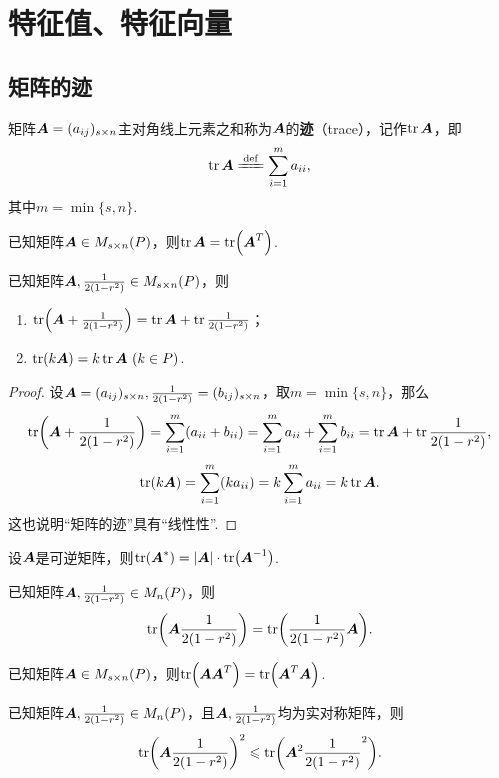 \chapter{特征值、特征向量}

\section{矩阵的迹}
\begin{definition}
矩阵\(\boldsymbol{A}=(a_{ij})_{s \times n}\)主对角线上元素之和称为\(\boldsymbol{A}\)的\textbf{迹}（trace），记作\(\tr\boldsymbol{A}\)，即\[
\tr\A \defeq \sum\limits_{i=1}^m a_{ii},
\]其中\(m = \min\{s,n\}\).
\end{definition}

\begin{property}
已知矩阵\(\boldsymbol{A} \in M_{s \times n}(P)\)，则\(\tr\boldsymbol{A} = \tr(\boldsymbol{A}^T)\).
\end{property}

\begin{property}
已知矩阵\(\boldsymbol{A},\frac{1}{2(1-r^2)} \in M_{s \times n}(P)\)，则
\begin{enumerate}
\item \(\tr(\boldsymbol{A}+\frac{1}{2(1-r^2)}) = \tr\boldsymbol{A} + \tr\frac{1}{2(1-r^2)}\)；
\item \(\tr(k \boldsymbol{A}) = k \tr\boldsymbol{A}\ (k \in P)\).
\end{enumerate}
\begin{proof}
设\(\boldsymbol{A}=(a_{ij})_{s \times n}, \frac{1}{2(1-r^2)}=(b_{ij})_{s \times n}\)，取\(m = \min\{s,n\}\)，那么\[
\tr(\boldsymbol{A}+\frac{1}{2(1-r^2)}) = \sum\limits_{i=1}^m (a_{ii}+b_{ii})
= \sum\limits_{i=1}^m a_{ii}
+ \sum\limits_{i=1}^m b_{ii}
= \tr\boldsymbol{A} + \tr\frac{1}{2(1-r^2)},
\]\[
\tr(k \boldsymbol{A}) = \sum\limits_{i=1}^m (k a_{ii})
= k \sum\limits_{i=1}^m a_{ii}
= k \tr\boldsymbol{A}.
\]这也说明“矩阵的迹”具有“线性性”.
\end{proof}
\end{property}

\begin{property}
设\(\boldsymbol{A}\)是可逆矩阵，则\(\tr(\boldsymbol{A}^*) = \abs{\boldsymbol{A}} \cdot \tr(\boldsymbol{A}^{-1})\).
\end{property}

\begin{property}
已知矩阵\(\boldsymbol{A},\frac{1}{2(1-r^2)} \in M_n(P)\)，则\[
\tr(\boldsymbol{A}\frac{1}{2(1-r^2)}) = \tr(\frac{1}{2(1-r^2)}\boldsymbol{A}).
\]
\end{property}

\begin{property}
已知矩阵\(\boldsymbol{A} \in M_{s \times n}(P)\)，则\(\tr(\boldsymbol{A}\boldsymbol{A}^T) = \tr(\boldsymbol{A}^T\boldsymbol{A})\).
\end{property}

\begin{property}
已知矩阵\(\boldsymbol{A},\frac{1}{2(1-r^2)} \in M_n(P)\)，且\(\boldsymbol{A},\frac{1}{2(1-r^2)}\)均为实对称矩阵，则\[
\tr(\boldsymbol{A}\frac{1}{2(1-r^2)})^2 \leqslant \tr(\boldsymbol{A}^2\frac{1}{2(1-r^2)}^2).
\]
\end{property}

